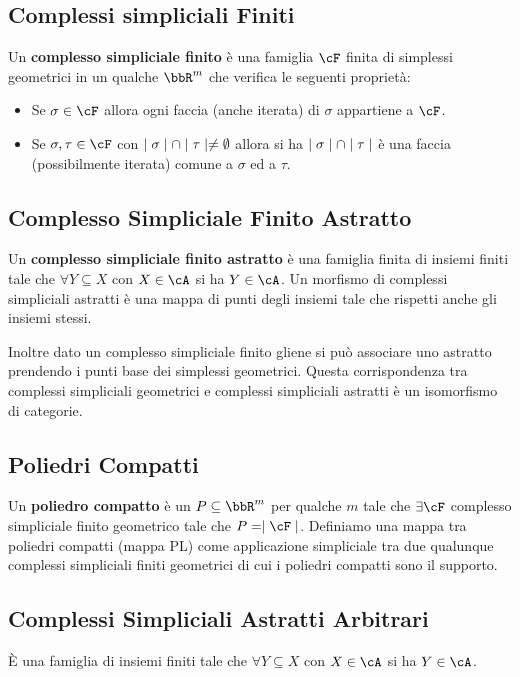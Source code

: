 \documentclass[a4paper,NoNotes,GeneralMath]{stdmdoc}
\begin{document}
\subsection*{Complessi simpliciali Finiti}
Un {\bf complesso simpliciale finito} è una famiglia $\cF$ finita di simplessi geometrici in un qualche $\bbR^m$ che verifica le seguenti proprietà:
\begin{itemize}
\item Se $\sigma \in \cF$ allora ogni faccia (anche iterata) di $\sigma$ appartiene a $\cF$.
\item Se $\sigma, \tau \in \cF$ con $\mid \sigma \mid \cap \mid \tau \mid \neq \emptyset$ allora si ha $\mid \sigma \mid \cap \mid \tau \mid$ è una faccia (possibilmente iterata) comune a $\sigma$ ed a $\tau$.
\end{itemize}

\subsection*{Complesso Simpliciale Finito Astratto}
Un {\bf complesso simpliciale finito astratto} è una famiglia finita di insiemi finiti tale che $\forall Y \subseteq X$ con $X \in \cA$ si ha $Y \in \cA$.
Un morfismo di complessi simpliciali astratti è una mappa di punti degli insiemi tale che rispetti anche gli insiemi stessi.

Inoltre dato un complesso simpliciale finito gliene si può associare uno astratto prendendo i punti base dei simplessi geometrici.
Questa corrispondenza tra complessi simpliciali geometrici e complessi simpliciali astratti è un isomorfismo di categorie.

\subsection*{Poliedri Compatti}
Un {\bf poliedro compatto} è un $P \subseteq \bbR^m$ per qualche $m$ tale che $\exists \cF$ complesso simpliciale finito geometrico tale che $P = \abs\cF$.
Definiamo una mappa tra poliedri compatti (mappa PL) come applicazione simpliciale tra due qualunque complessi simpliciali finiti geometrici di cui i poliedri compatti sono il supporto.

\subsection*{Complessi Simpliciali Astratti Arbitrari}
È una famiglia di insiemi finiti tale che $\forall Y \subseteq X$ con $X \in \cA$ si ha $Y \in \cA$.
\end{document}
